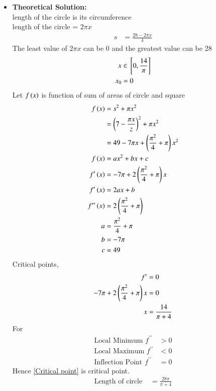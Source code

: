 \documentclass[journal]{IEEEtran}
\numberwithin{equation}{enumi}
\numberwithin{figure}{enumi}
\begin{document}
\begin{itemize}
    \item \textbf{Theoretical Solution:}\\
    length of the circle is its circumference\\
    length of the circle = $2\pi x$
    \begin{align}
        s &= \frac{28 - 2\pi x}{4}
    \end{align}
    The least value of $2\pi x$ can be 0 and the greatest value can be 28
    \begin{align}
        x &\in {}\left[0, \frac{14}{\pi}\right]\\
        x_0 &= 0
    \end{align}
    Let $f\left(x\right)$ is function of sum of areas of circle and square
    \begin{align}
        f\left(x\right) &= s^2 + \pi x^2\\
         &= \left(7 - \frac{\pi x}{z}\right)^2 + \pi x^2\\
         &= 49 - 7\pi x + \left(\frac{\pi^2}{4} + \pi\right)x^2\\
        f\left(x\right) &= ax^2 + bx + c \\
        f^{\prime}\left(x\right) &= -7\pi + 2\left(\frac{\pi^2}{4} + \pi\right)x\\
        f^{\prime}\left(x\right) &= 2ax + b\\
        f^{\prime\prime}\left(x\right) &= 2\left(\frac{\pi^2}{4} + \pi\right)\\
        a &= \frac{\pi^2}{4} + \pi\\
        b &= -7\pi\\
        c &= 49
    \end{align}
    Critical points, 
    \begin{align}
        f^{\prime} &= 0\\
        -7\pi + 2\left(\frac{\pi^2}{4} + \pi\right)x &= 0\\
        x &= \frac{14}{\pi + 4} \label{Critical point}
    \end{align}
    For
    \begin{align}
        \text{Local Minimum } f^{\prime\prime} &> 0\\
        \text{Local Maximum } f^{\prime\prime} &< 0\\
        \text{Inflection Point } f^{\prime\prime} &= 0
    \end{align}
    Hence \eqref{Critical point} is critical point.
    \begin{align}
        \text{Length of circle } &= \frac{28\pi}{\pi + 4}\\

\end{align}
\end{itemize}
\end{document}
